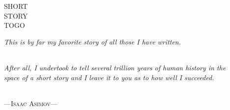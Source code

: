 \thispagestyle{empty}

\vspace*{-0.0cm}
\hspace{-7.3cm}
\begin{minipage}[t]{5cm}
{\small
	\begin{spacing}{15}
	\noindent
	\fontsize{96pt}{8pt}\selectfont
		\hspace{.0cm}SHORT\\
		{STORY}\\
		\mbox{TO\hspace{1.4cm}GO}\\


	\end{spacing}

}
\vspace*{-6.2cm}
\begin{minipage}[t]{12.5cm}
{\centering
\textit{This is by far my favorite story of all those I have written.}

\ \\

\textit{
After all, I undertook to tell several trillion years of human history in the \\space of a short story and I leave it to you as to how well I 
succeeded.}
\\ \ \\

\begin{center}

---\textsc{Isaac Asimov}---
\end{center}
}
\end{minipage}
\end{minipage}



\newpage
